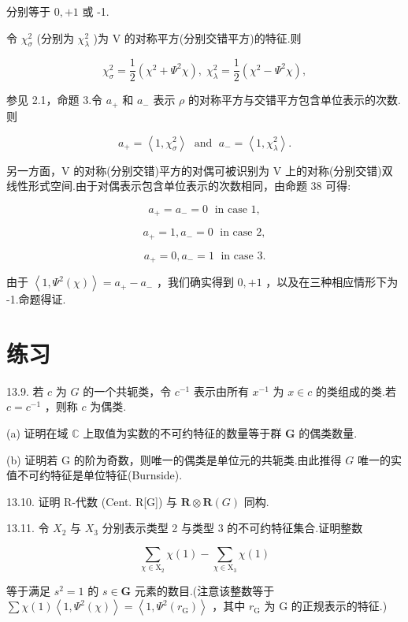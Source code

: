 \documentclass[10pt]{article}
\begin{document}
分别等于 \(0, + 1\) 或 -1.

令 \({\chi }_{\sigma }^{2}\) (分别为 \({\chi }_{\lambda }^{2}\) )为 V 的对称平方(分别交错平方)的特征.则

\[
{\chi }_{\sigma }^{2} = \frac{1}{2}\left( {{\chi }^{2} + {\Psi }^{2}\chi }\right) ,\;{\chi }_{\lambda }^{2} = \frac{1}{2}\left( {{\chi }^{2} - {\Psi }^{2}\chi }\right) ,
\]

参见 2.1，命题 3.令 \({a}_{ + }\) 和 \({a}_{ - }\) 表示 \(\rho\) 的对称平方与交错平方包含单位表示的次数.则

\[
{a}_{ + } = \left\langle  {1,{\chi }_{\sigma }^{2}}\right\rangle  \;\text{ and }\;{a}_{ - } = \left\langle  {1,{\chi }_{\lambda }^{2}}\right\rangle  .
\]

另一方面，V 的对称(分别交错)平方的对偶可被识别为 V 上的对称(分别交错)双线性形式空间.由于对偶表示包含单位表示的次数相同，由命题 38 可得:

\[
{a}_{ + } = {a}_{ - } = 0\;\text{ in case }1,
\]

\[
{a}_{ + } = 1,{a}_{ - } = 0\;\text{ in case }2,
\]

\[
{a}_{ + } = 0,{a}_{ - } = 1\;\text{ in case }3.
\]

由于 \(\left\langle  {1,{\Psi }^{2}\left( \chi \right) }\right\rangle   = {a}_{ + } - {a}_{ - }\) ，我们确实得到 \(0, + 1\) ，以及在三种相应情形下为 -1.命题得证.

\section*{练习}

13.9. 若 \(c\) 为 \(G\) 的一个共轭类，令 \({c}^{-1}\) 表示由所有 \({x}^{-1}\) 为 \(x \in  c\) 的类组成的类.若 \(c = {c}^{-1}\) ，则称 \(c\) 为偶类.

(a) 证明在域 \(\mathbb{C}\) 上取值为实数的不可约特征的数量等于群 \(\mathbf{G}\) 的偶类数量.

(b) 证明若 G 的阶为奇数，则唯一的偶类是单位元的共轭类.由此推得 \(G\) 唯一的实值不可约特征是单位特征(Burnside).

13.10. 证明 R-代数 (Cent. R[G]) 与 \(\mathbf{R} \otimes  \mathbf{R}\left( G\right)\) 同构.

13.11. 令 \({X}_{2}\) 与 \({X}_{3}\) 分别表示类型 2 与类型 3 的不可约特征集合.证明整数

\[
\mathop{\sum }\limits_{{\chi  \in  {\mathrm{X}}_{2}}}\chi \left( 1\right)  - \mathop{\sum }\limits_{{\chi  \in  {\mathrm{X}}_{3}}}\chi \left( 1\right)
\]

等于满足 \({s}^{2} = 1\) 的 \(s \in  \mathbf{G}\) 元素的数目.(注意该整数等于 \(\sum \chi \left( 1\right) \left\langle  {1,{\Psi }^{2}\left( \chi \right) }\right\rangle   = \left\langle  {1,{\Psi }^{2}\left( {r}_{\mathrm{G}}\right) }\right\rangle\) ，其中 \({r}_{\mathrm{G}}\) 为 G 的正规表示的特征.)
\end{document}
